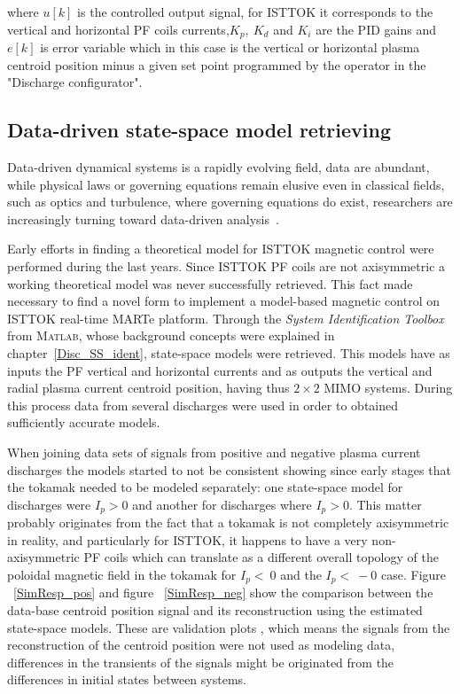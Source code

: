 where $u[k]$ is the controlled output signal, for ISTTOK it corresponds to the vertical and horizontal PF coils currents,$K_p,~K_d$ and $K_i$ are the PID gains and $e[k]$ is error variable which in this case is  the vertical or horizontal plasma centroid position minus a given set point programmed by the operator in the "Discharge configurator".

\subsection{Data-driven state-space model retrieving }

Data-driven dynamical systems is a rapidly evolving field, data are abundant, while physical laws or governing equations remain elusive even in classical fields, such as optics and turbulence, where governing equations do exist, researchers are increasingly turning toward data-driven analysis~\cite[Chapter~7]{DataDriven2019}.\smallskip

Early efforts in finding a theoretical model for ISTTOK magnetic control were performed during  the last years. Since ISTTOK PF coils are not axisymmetric a working theoretical model  was never successfully retrieved. This fact made necessary to find a novel form to implement a model-based magnetic control on ISTTOK real-time MARTe platform.   Through  the \textit{System Identification Toolbox} from \textsc{Matlab}, whose background concepts were explained in chapter~\ref{Disc_SS_ident}, state-space models were retrieved. This models have as inputs the PF vertical and horizontal currents and as outputs the vertical and radial plasma current centroid position, having thus  $2\times 2$ MIMO systems. During this process data from several discharges were used in order to obtained  sufficiently  accurate models.\smallskip

 When joining data sets of signals from  positive and negative plasma current discharges  the models started to not be consistent showing since early stages that the tokamak needed to be modeled separately: one state-space model for discharges were $I_p > 0$ and another for discharges where $I_p>0$. This matter probably originates from the fact that a  tokamak is not completely axisymmetric in reality, and particularly for ISTTOK, it happens to have a very non-axisymmetric PF coils which can translate as a different overall topology of the poloidal magnetic field in the tokamak for $I_p<~0$ and the  $I_p<~-0$ case. Figure ~\ref{SimResp_pos} and figure ~\ref{SimResp_neg} show the comparison between  the data-base centroid position signal and its reconstruction using the estimated state-space models. These are validation plots , which means the signals from the reconstruction of the centroid position were not used as modeling data, differences in the transients of the signals might be originated from the differences in initial states between systems.\smallskip



